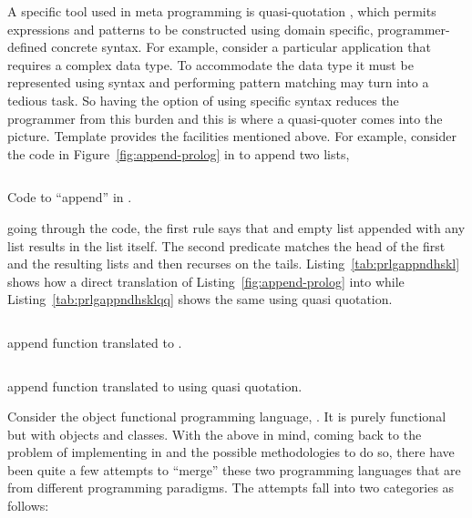\documentclass[thesis-solanki.tex]{subfiles}
\begin{document}
A specific tool used in meta programming is quasi-quotation \cite{mainland2007s,haskellquasi,wikiquasi}, which
permits  expressions and patterns to be constructed using domain specific,
pro\-gram\-mer-de\-fined concrete syntax.
For example, consider a particular application that requires a complex data type.
To accommodate the data type it must be represented
using  syntax and performing pattern matching may turn into a tedious task.
So having the option of using specific syntax reduces the programmer from this burden and this is where a
quasi-quoter comes into the picture.
Template  provides the facilities mentioned above.
For example, consider the code in Figure~\ref{fig:append-prolog}
in  to append two lists,
\begin{code-list}[h]
\begin{singlespace}
\inputminted[linenos]{prolog}{prolog-background-append.pl}
\end{singlespace}   
\caption{Code to ``append'' in \protect{}.}
\label{fig:append-prolog}
\end{code-list}
going through the code, the first rule says that and empty list appended with any list results in the list itself.
The second predicate matches the head of the first and the resulting lists and then recurses on the tails.
Listing~\ref{tab:prlgappndhskl} shows how a direct translation of Listing~\ref{fig:append-prolog} into
 while Listing~\ref{tab:prlgappndhsklqq} shows the same using quasi quotation.

\begin{code-list}[th]
  \begin{singlespace}
    \inputminted[linenos]{haskell}{append_no_quasi.hs}
  \end{singlespace}
  \caption{ append function translated to .}
\label{tab:prlgappndhskl}
\end{code-list}

\begin{code-list}[th]
  \begin{singlespace}
    \inputminted[linenos]{haskell}{append_quasi_quote.hs}
  \end{singlespace}
  \caption{ append function translated to  using quasi quotation.}
\label{tab:prlgappndhsklqq}
\end{code-list}


Consider the object functional programming language, 
\cite{website:scala}.
It is purely functional but with objects and classes.
With the above in mind, coming back to the problem of implementing  in  and the
possible methodologies to do so, there have been quite a few attempts to ``merge'' these two programming languages
that are from different programming paradigms.
The attempts fall into two categories as follows:
\end{document}
